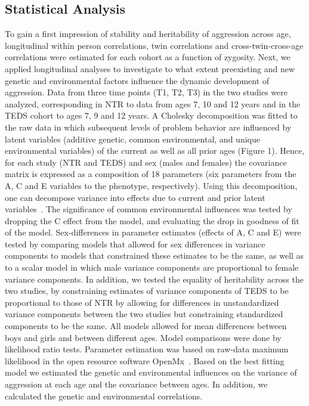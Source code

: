 \subsection{Statistical Analysis}
To gain a first impression of stability and heritability of aggression across age, longitudinal within person correlations, twin correlations and cross-twin-cross-age correlations were estimated for each cohort as a function of zygosity.
Next, we applied longitudinal analyses to investigate to what extent preexisting and new genetic and environmental factors influence the dynamic development of aggression.
Data from three time points (T1, T2, T3) in the two studies were analyzed, corresponding in NTR to data from ages 7, 10 and 12 years and in the TEDS cohort to ages 7, 9 and 12 years.
A Cholesky decomposition was fitted to the raw data in which subsequent levels of problem behavior are influenced by latent variables (additive genetic, common environmental, and unique environmental variables) of the current as well as all prior ages (Figure 1).
Hence, for each study (NTR and TEDS) and sex (males and females) the covariance matrix is expressed as a composition of 18 parameters (six parameters from the A, C and E variables to the phenotype, respectively).
Using this decomposition, one can decompose variance into effects due to current and prior latent variables~\cite{Franić2014}.
The significance of common environmental influences was tested by dropping the C effect from the model, and evaluating the drop in goodness of fit of the model.
Sex-differences in parameter estimates (effects of A, C and E) were tested by comparing models that allowed for sex differences in variance components to models that constrained these estimates to be the same, as well as to a scalar model in which male variance components are proportional to female variance components.
In addition, we tested the equality of heritability across the two studies, by constraining estimates of variance components of TEDS to be proportional to those of NTR by allowing for differences in unstandardized variance components between the two studies but constraining standardized components to be the same.
All models allowed for mean differences between boys and girls and between different ages.
Model comparisons were done by likelihood ratio tests.
Parameter estimation was based on raw-data maximum likelihood in the open resource software OpenMx~\cite{Boker2011}.
Based on the best fitting model we estimated the genetic and environmental influences on the variance of aggression at each age and the covariance between ages.
In addition, we calculated the genetic and environmental correlations.
